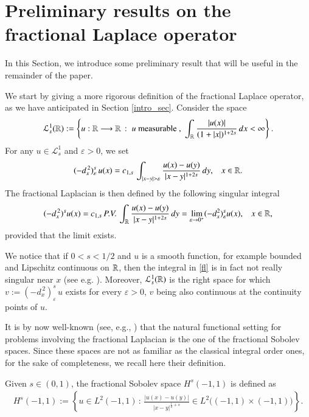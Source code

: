 \section{Preliminary results on the fractional Laplace operator}\label{theor_sec}

In this Section, we introduce some preliminary result that will be useful in the remainder of the paper.

We start by giving a more rigorous definition of the fractional Laplace operator, as we have anticipated in Section \ref{intro_sec}. Consider the space
\begin{align*}
	\mathcal L^1_s(\mathbb{R}) :=\left\{ u:\mathbb{R}\longrightarrow\mathbb{R}\,:\; u\textrm{ measurable },\;\int_{\mathbb{R}}\frac{|u(x)|}{(1+|x|)^{1+2s}}\,dx<\infty\right\}.
\end{align*}
For any $u\in\mathcal L_s^1$ and $\varepsilon>0$, we set 
\begin{align*}
	(-d_x^{\,2})^s_{\varepsilon}\, u(x) = \ccs\,\int_{|x-y|>\varepsilon}\frac{u(x)-u(y)}{|x-y|^{1+2s}}\,dy,\;\;\; x\in\RR.
\end{align*}
The fractional Laplacian is then defined by the following singular integral
\begin{align}\label{fl}
	(-d_x^{\,2})^{s}u(x) = c_{1,s}\,P.V.\,\int_{\mathbb{R}}\frac{u(x)-u(y)}{|x-y|^{1+2s}}\,dy = \lim_{\varepsilon\to 0^+} (-d_x^2)^s_{\varepsilon} u(x), \;\;\; x\in\mathbb{R},
\end{align}
provided that the limit exists. 

We notice that if $0<s<1/2$ and $u$ is a smooth function, for example bounded and Lipschitz continuous on $\mathbb{R}$, then the integral in \eqref{fl} is in fact not really singular near $x$ (see e.g. \cite[Remark 3.1]{dihitchhiker}). Moreover, $\mathcal L_s^1(\mathbb{R})$ is the right space for which $v:= (-d_x^{\,2})^s_{\varepsilon}\, u$ exists for every $\varepsilon > 0$, $v$ being also continuous at the continuity points of $u$.

It is by now well-known (see, e.g., \cite{dihitchhiker}) that the natural functional setting for problems involving the fractional Laplacian is the one of the fractional Sobolev spaces. Since these spaces are not as familiar as the classical integral order ones, for the sake of completeness, we recall here their definition. 

Given $s\in(0,1)$, the fractional Sobolev space $H^s(-1,1)$ is defined as
\begin{align*}
	H^s(-1,1):= \left\{u\in L^2(-1,1)\,:\, \frac{|u(x)-u(y)|}{|x-y|^{\frac 12+s}}\in L^2\Big((-1,1)\times(-1,1)\Big) \right\}.
\end{align*}

